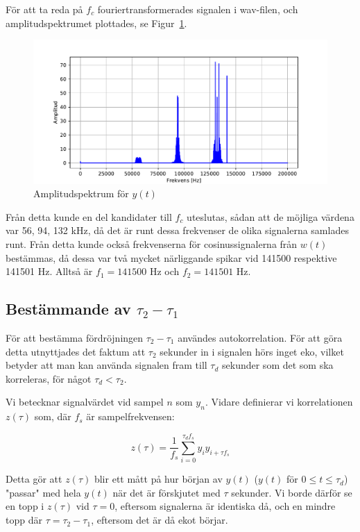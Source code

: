 \documentclass[10pt,twocolumn]{article}
\begin{document}
För att ta reda på $f_c$ fouriertransformerades signalen i wav-filen, och
amplitudspektrumet plottades, se Figur~\ref{fig:yamp}. 
\begin{figure}[h]
    \centering
    \includegraphics[width=\linewidth]{figures/yamp.pdf}
    \caption{Amplitudspektrum för $y(t)$}\label{fig:yamp}
\end{figure}
Från detta kunde en del kandidater till $f_c$ uteslutas, sådan att
de möjliga värdena var 56, 94, 132 kHz, då det är runt dessa frekvenser de
olika signalerna samlades runt. Från detta kunde också frekvenserna för
cosinussignalerna från $w(t)$
bestämmas, då dessa var två mycket närliggande spikar vid 141500 respektive
141501 Hz. Alltså är $f_1=141500$ Hz och $f_2=141501$ Hz.

\subsection{Bestämmande av $\tau_2 - \tau_1$}
För att bestämma fördröjningen $\tau_2 - \tau_1$ användes autokorrelation. För
att göra detta utnyttjades det faktum att $\tau_2$ sekunder in i signalen
hörs inget eko, vilket betyder att man kan använda signalen fram till $\tau_d$
sekunder som det som ska korreleras, för något $\tau_d < \tau_2$.

Vi betecknar signalvärdet vid sampel $n$ som $y_n$. Vidare definierar vi korrelationen
$z(\tau)$ som, där $f_s$ är sampelfrekvensen:

\begin{equation*}
    z(\tau) = \frac{1}{f_s}\sum_{i=0}^{\tau_d f_s}y_iy_{i + \tau f_s}
\end{equation*}

Detta gör att $z(\tau)$ blir ett mått på hur början av $y(t)$ ($y(t)$ för $0
\leq t \leq \tau_d$)
"passar" med hela $y(t)$ när det är förskjutet med $\tau$ sekunder. Vi
borde därför se en topp i $z(\tau)$ vid $\tau = 0$, eftersom signalerna är identiska då, och en mindre topp där $\tau
= \tau_2 - \tau_1$, eftersom det är då ekot börjar.
\end{document}
